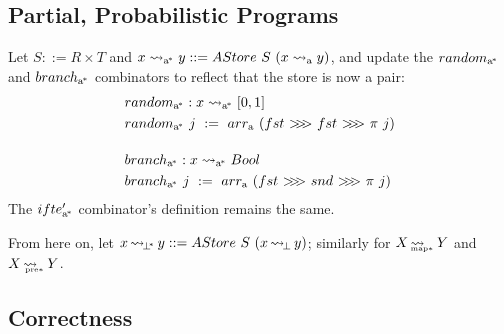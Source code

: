 \documentclass[preprint]{sigplanconf}
\newcommand{\arrow}{\rightsquigarrow}
\newcommand{\arrowarr}{\ensuremath{arr}}
\newcommand{\arrowcomp}{\ensuremath{{>}\mspace{-6mu}{>}\mspace{-6mu}{>}}}
\newcommand{\arrowif}{\ensuremath{ifte}}
\newcommand{\gen}{_\mathrm{a}}
\newcommand{\genc}{_\mathrm{a^{\mspace{-2mu}*}}}
\DeclareMathOperator{\botto}{\arrow_{\mspace{-3mu}\bot}}
\newcommand{\pbot}{{\bot^{\mspace{-4mu}*}}}
\DeclareMathOperator{\pbotto}{\arrow_{\mspace{-3mu}\pbot}}
\DeclareMathOperator{\pmapto}{\arrow_{\mspace{-22mu}_{\mathrm{map*}}}}
\DeclareMathOperator{\ppreto}{\arrow_{\mspace{-19mu}_{\mathrm{pre*}}}}
\begin{document}
\subsection{Partial, Probabilistic Programs}

Let $S ::= R \times T$ and $x \arrow\genc y ::= AStore~S~(x \arrow\gen y)$, and update the $random\genc$ and $branch\genc$ combinators to reflect that the store is now a pair:
\begin{align}
	&\begin{aligned}
		&random\genc : x \arrow\genc [0,1] \\
		&random\genc~j \ := \ \arrowarr\gen~(fst~\arrowcomp~fst~\arrowcomp~\pi~j)
	\end{aligned} \\
\nonumber\\[-6pt]
	&\begin{aligned}
		&branch\genc : x \arrow\genc Bool \\
		&branch\genc~j \ := \ \arrowarr\gen~(fst~\arrowcomp~snd~\arrowcomp~\pi~j)
	\end{aligned}
\end{align}
The $\arrowif\genc'$ combinator's definition remains the same.

From here on, let $x \pbotto y ::= AStore~S~(x \botto y)$; similarly for $X \pmapto Y$ and $X \ppreto Y$.

\subsection{Correctness}
\end{document}
